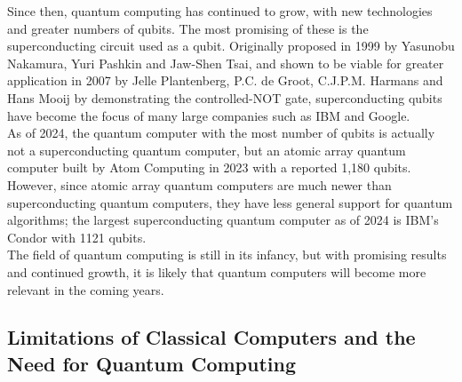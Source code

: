 \documentclass[reqno]{amsart}
\numberwithin{equation}{section}
\numberwithin{figure}{section}
\begin{document}
\begin{justify}
Since then, quantum computing has continued to grow, with new technologies and greater numbers of qubits. The most promising of these is the superconducting circuit used as a qubit. Originally proposed in 1999 by Yasunobu Nakamura, Yuri Pashkin and Jaw-Shen Tsai, \cite{NakamuraPashkinTsai1999} and shown to be viable for greater application in 2007 by Jelle Plantenberg, P.C. de Groot, C.J.P.M. Harmans and Hans Mooij by demonstrating the controlled-NOT gate, \cite{PlantenbergGrootHarmansMooij2007} superconducting qubits have become the focus of many large companies such as IBM and Google. \\

As of 2024, the quantum computer with the most number of qubits is actually not a superconducting quantum computer, but an atomic array quantum computer built by Atom Computing in 2023 \cite{Atom2023, Atom2024} with a reported 1,180 qubits. However, since atomic array quantum computers are much newer than superconducting quantum computers, they have less general support for quantum algorithms; the largest superconducting quantum computer as of 2024 is IBM's Condor with 1121 qubits. \cite{IBM2023, AbuGhanem2024} \\

The field of quantum computing is still in its infancy, but with promising results and continued growth, it is likely that quantum computers will become more relevant in the coming years.
\end{justify}

\subsection{Limitations of Classical Computers and the Need for Quantum Computing}
\end{document}
